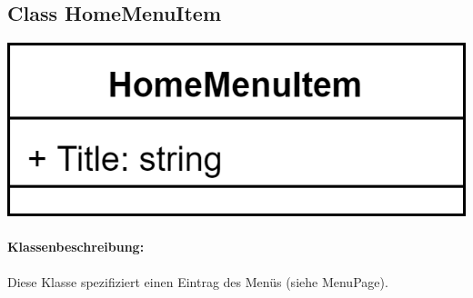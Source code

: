 \documentclass[a4paper,12pt]{article}
\begin{document}
\begin{minipage}[b]{0.7\textwidth}

	\subsection{Class HomeMenuItem}
\end{minipage}
\begin{minipage}[c]{0.3\textwidth}
	\includegraphics[width=\textwidth]{bilder/ViewModelKlassen/HomeMenuItem.png}
\end{minipage}
	\paragraph{Klassenbeschreibung:}
	Diese Klasse spezifiziert einen Eintrag des Menüs (siehe MenuPage). 
\end{document}
